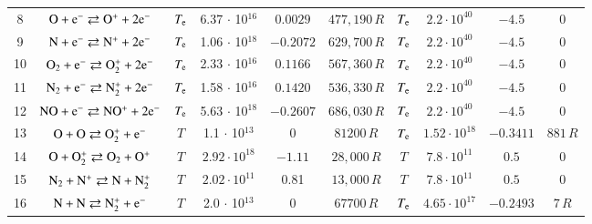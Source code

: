 \documentclass{warpdoc}
\begin{document}
\begin{table}[t]
\begin{center}
\begin{threeparttable}
\begin{tabular}{cccccccccc}
8 & $\rm O + e^- \rightleftarrows O^++2e^-$ &$T_{\rm e}$ & 6.37 $\cdot$ 10$^{16}$ & $0.0029$ & $477,190\, R$ 
                                          &$T_{\rm e}$ & $2.2 \cdot 10^{40}$  & $-4.5$  & 0\\
9 & $\rm N + e^- \rightleftarrows N^++2e^-$ &$T_{\rm e}$ & 1.06 $\cdot$ 10$^{18}$ & $-0.2072$ & $629,700\, R$ 
                                          &$T_{\rm e}$ & $2.2 \cdot 10^{40}$  & $-4.5$  & 0\\
10 & $\rm O_2 + e^- \rightleftarrows O_2^++2e^-$ &$T_{\rm e}$ & 2.33 $\cdot$ 10$^{16}$ & $0.1166$ & $567,360\, R$ 
                                          &$T_{\rm e}$ & $2.2 \cdot 10^{40}$  & $-4.5$  & 0\\
11 & $\rm N_2 + e^- \rightleftarrows N_2^++2e^-$ &$T_{\rm e}$ & 1.58 $\cdot$ 10$^{16}$ & $0.1420$ & $536,330\, R$ 
                                          &$T_{\rm e}$ & $2.2 \cdot 10^{40}$  & $-4.5$  & 0\\
12 & $\rm NO + e^- \rightleftarrows NO^++2e^-$ &$T_{\rm e}$ & 5.63 $\cdot$ 10$^{18}$ & $-0.2607$ & $686,030\, R$ 
                                          &$T_{\rm e}$ & $2.2 \cdot 10^{40}$  & $-4.5$  & 0\\


13 & $\rm O + O \rightleftarrows O_2^+ + e^- $ & $T$  & 1.1 $\cdot$ 10$^{13}$  & 0 & $81200 \, R$ & $T_{\rm e}$ & $1.52 \cdot 10^{18}$ & $-0.3411$ & $881\, R$\\


14 & $\rm O + O_2^+ \rightleftarrows O_2+O^+$ &$T$ & $2.92 \cdot 10^{18}$ & $-1.11$ & $28,000\, R$ 
                                          &$T$ & $7.8 \cdot 10^{11}$  & $0.5$  & 0\\
15 & $\rm N_2 + N^+ \rightleftarrows N+N_2^{+}$ &$T$ & $2.02 \cdot 10^{11}$ & 0.81 & $13,000 \, R$ 
                                          &$T$ & $7.8 \cdot 10^{11}$  & $0.5$  & 0\\

16 & $\rm N + N \rightleftarrows N_2^+ + e^- $ & $T$ & 2.0 $\cdot$ 10$^{13}$  & 0 & $67700 \, R$ & $T_{\rm e}$ &  $4.65 \cdot 10^{17}$ & $-0.2493$ & $7\, R$ \\


\end{tabular}
\end{threeparttable}
\end{center}
\end{table}
\end{document}
